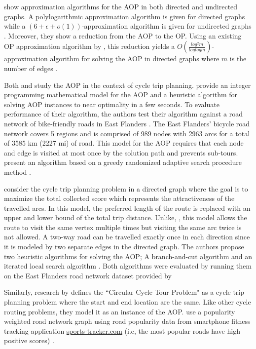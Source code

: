 \documentclass[11pt]{article}
\begin{document}
 
\citeauthor{gavalas2015approximation} show approximation algorithms for the AOP in both directed and undirected graphs. A polylogarithmic approximation algorithm is given for directed graphs while a $(6 + \epsilon + o(1))$-approximation algorithm is given for undirected graphs \cite{gavalas2015approximation}. Moreover, they show a reduction from the AOP to the OP. Using an existing OP approximation algorithm by \citeauthor{nagarajan2011directed}, this reduction yields a $O(\frac{log^2m}{loglogm})$-approximation algorithm for solving the AOP in directed graphs where $m$ is the number of edges \cite{gavalas2015approximation}.

Both \citeauthor{souffriau2011planning} and \citeauthor{verbeeck2014extension} study the AOP in the context of cycle trip planning. \citeauthor{souffriau2011planning} provide an integer programming mathematical model for the AOP and a heuristic algorithm for solving AOP instances to near optimality in a few seconds. To evaluate performance of their algorithm, the authors test their algorithm against a road network of bike-friendly roads in East Flanders \cite{souffriau2011planning}. The East Flanders' bicycle road network covers 5 regions and is comprised of 989 nodes with 2963 arcs for a total of 3585 km (2227 mi) of road. This model for the AOP requires that each node and edge is visited at most once by the solution path and prevents sub-tours. \citeauthor{souffriau2011planning} present an algorithm based on a greedy randomized adaptive search procedure method \cite{souffriau2011planning}.

\citeauthor{verbeeck2014extension} consider the cycle trip planning problem in a directed graph where the goal is to maximize the total collected score which represents the attractiveness of the travelled arcs. In this model, the preferred length of the route is replaced with an upper and lower bound of the total trip distance. Unlike, \citeauthor{souffriau2011planning}, this model allows the route to visit the same vertex multiple times but visiting the same arc twice is not allowed. A two-way road can be travelled exactly once in each direction since it is modeled by two separate edges in the directed graph. The authors propose two heuristic algorithms for solving the AOP; A branch-and-cut algorithm and an iterated local search algorithm \cite{verbeeck2014extension}. Both algorithms were evaluated by running them on the East Flanders road network dataset provided by \citeauthor{souffriau2011planning}

Similarly, research by \citeauthor{bergman2015optimization} defines the ``Circular Cycle Tour Problem" as a cycle trip planning problem where the start and end location are the same. Like other cycle routing problems, they model it as an instance of the AOP. \citeauthor{bergman2015optimization} use a popularity weighted road network graph using road popularity data from smartphone fitness tracking application \href{http://www.sports-tracker.com/}{sports-tracker.com} (i.e, the most popular roads have high positive scores) \cite{bergman2015optimization}.
\end{document}

